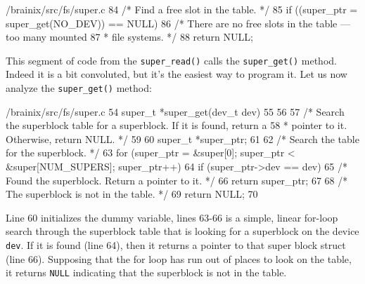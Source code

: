 \begin{code}{/brainix/src/fs/super.c}
84      /* Find a free slot in the table. */
85      if ((super_ptr = super_get(NO_DEV)) == NULL)
86           /* There are no free slots in the table --- too many mounted
87            * file systems. */
88           return NULL;
\end{code}
This segment of code from the \verb|super_read()| calls the \verb|super_get()| method. Indeed it is a bit convoluted, but it's the easiest way to program it. Let us now analyze the \verb|super_get()| method:
\begin{code}{/brainix/src/fs/super.c}
54 super_t *super_get(dev_t dev)
55 {
56 
57 /* Search the superblock table for a superblock.  If it is found, return a
58  * pointer to it.  Otherwise, return NULL. */
59 
60      super_t *super_ptr;
61 
62      /* Search the table for the superblock. */
63      for (super_ptr = &super[0]; super_ptr < &super[NUM_SUPERS]; super_ptr++)
64           if (super_ptr->dev == dev)
65                /* Found the superblock.  Return a pointer to it. */
66                return super_ptr;
67 
68      /* The superblock is not in the table. */
69      return NULL;
70 }
\end{code}
Line 60 initializes the dummy variable, lines 63-66 is a simple, linear for-loop search through the superblock table that is looking for a superblock on the device \verb|dev|. If it is found (line 64), then it returns a pointer to that super block struct (line 66). Supposing that the for loop has run out of places to look on the table, it returns \verb|NULL| indicating that the superblock is not in the table.

